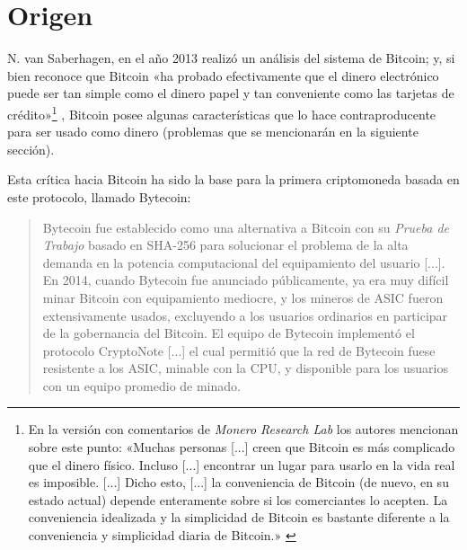\documentclass[12pt,a4paper,twoside]{book}
\begin{document}
\section{Origen}
N. van Saberhagen, en el año 2013 realizó un análisis del sistema de Bitcoin; y, si bien reconoce que Bitcoin «ha probado efectivamente que el dinero electrónico puede ser tan simple como el dinero papel y tan conveniente como las tarjetas de crédito»\footnote{En la versión con comentarios de \textit{Monero Research Lab} los autores mencionan sobre este punto: «Muchas personas [...] creen que Bitcoin es más complicado que el dinero físico. Incluso [...] encontrar un lugar para usarlo en la vida real es imposible. [...] Dicho esto, [...] la conveniencia de Bitcoin (de nuevo, en su estado actual) depende enteramente sobre si los comerciantes lo acepten. La conveniencia idealizada y la simplicidad de Bitcoin es bastante diferente a la conveniencia y simplicidad diaria de Bitcoin.» \cite[pág. 1]{monero:wpcomentarios}} \cite[pág. 1]{monero:whitepaper}, Bitcoin posee algunas características que lo hace contraproducente para ser usado como dinero (problemas que se mencionarán en la siguiente sección).

Esta crítica hacia Bitcoin ha sido la base para la primera criptomoneda basada en este protocolo, llamado Bytecoin:

\begin{quotation}
Bytecoin fue establecido como una alternativa a Bitcoin con su \textit{Prueba de Trabajo} basado en SHA-256 para solucionar el problema de la alta demanda en la potencia computacional del equipamiento del usuario [...]. En 2014, cuando Bytecoin fue anunciado públicamente, ya era muy difícil minar Bitcoin con equipamiento mediocre, y los mineros de ASIC fueron extensivamente usados, excluyendo a los usuarios ordinarios en participar de la gobernancia del Bitcoin. El equipo de Bytecoin implementó el protocolo CryptoNote [...] el cual permitió que la red de Bytecoin fuese resistente a los ASIC, minable con la CPU, y disponible para los usuarios con un equipo promedio de minado. \cite{bytecoin:historia}
\end{quotation}
\end{document}
